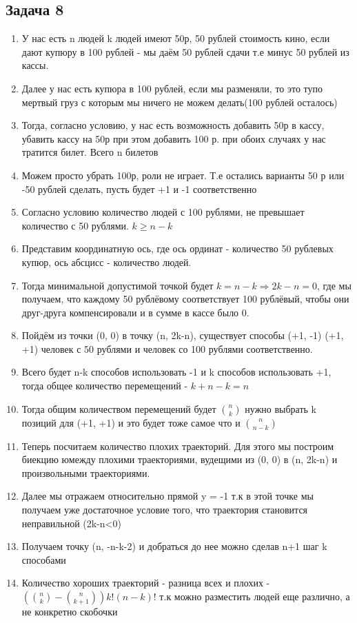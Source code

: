 \documentclass[a4paper,12pt]{article}
\begin{document}
\subsection{Задача 8}
\begin{enumerate}
    \item У нас есть n людей k людей имеют 50р, 50 рублей стоимость кино, если дают купюру в 100 рублей - мы даём 50 рублей сдачи т.е минус 50 рублей из кассы.
    \item Далее у нас есть купюра в 100 рублей, если мы разменяли, то это тупо мертвый груз с которым мы ничего не можем делать(100 рублей осталось)
    \item Тогда, согласно условию, у нас есть возможность добавить 50р в кассу, убавить кассу на 50р при этом добавить 100 р. при обоих случаях у нас тратится билет. Всего n билетов
    \item Можем просто убрать 100р, роли не играет. Т.е остались варианты 50 р или -50 рублей сделать, пусть будет +1 и -1 соответственно
    \item Согласно условию количество людей с 100 рублями, не превышает количество с 50 рублями. $k \ge n-k$
    \item Представим координатную ось, где ось ординат - количество 50 рублевых купюр, ось абсцисс - количество людей.
    \item Тогда минимальной допустимой точкой будет $k=n-k \Rightarrow 2k-n=0$, где мы получаем, что каждому 50 рублёвому соответствует 100 рублёвый, чтобы они друг-друга компенсировали и в сумме в кассе было 0.
    \item Пойдём из точки (0, 0) в точку (n, 2k-n), существует способы (+1, -1) (+1, +1) человек с 50 рублями и человек со 100 рублями соответственно.
    \item Всего будет n-k способов использовать -1 и k способов использовать +1, тогда общее количество перемещений - $k+n-k = n $
    \item Тогда общим количеством перемещений будет $\binom{n}{k}$ нужно выбрать k позиций для (+1, +1) и это будет тоже самое что и $\binom{n}{n-k}$
    \item Теперь посчитаем количество плохих траекторий. Для этого мы построим биекцию юмежду плохими траекториями, вудещими из (0, 0) в (n, 2k-n) и произвольными траекториями.
    \item Далее мы отражаем относительно прямой y = -1 т.к в этой точке мы получаем уже достаточное условие того, что траектория становится неправильной (2k-n<0)
    \item Получаем точку (n, -n-k-2) и добраться до нее можно сделав n+1 шаг k способами
    \item Количество хороших траекторий - разница всех и плохих - $(\binom{n}{k}-\binom{n}{k+1})k!(n-k)!$ т.к можно разместить людей еще различно, а не конкретно скобочки

\end{enumerate}
\end{document}
